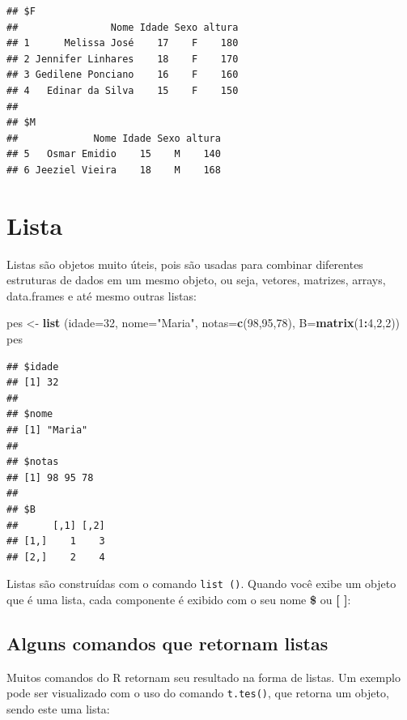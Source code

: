 \documentclass[
]{book}
\newenvironment{Shaded}{\begin{snugshade}}{\end{snugshade}}
\newcommand{\DataTypeTok}[1]{\textcolor[rgb]{0.13,0.29,0.53}{#1}}
\newcommand{\DecValTok}[1]{\textcolor[rgb]{0.00,0.00,0.81}{#1}}
\newcommand{\KeywordTok}[1]{\textcolor[rgb]{0.13,0.29,0.53}{\textbf{#1}}}
\newcommand{\NormalTok}[1]{#1}
\newcommand{\OperatorTok}[1]{\textcolor[rgb]{0.81,0.36,0.00}{\textbf{#1}}}
\newcommand{\StringTok}[1]{\textcolor[rgb]{0.31,0.60,0.02}{#1}}
\begin{document}
\begin{verbatim}
## $F
##                Nome Idade Sexo altura
## 1      Melissa José    17    F    180
## 2 Jennifer Linhares    18    F    170
## 3 Gedilene Ponciano    16    F    160
## 4   Edinar da Silva    15    F    150
## 
## $M
##             Nome Idade Sexo altura
## 5   Osmar Emidio    15    M    140
## 6 Jeeziel Vieira    18    M    168
\end{verbatim}

\hypertarget{lista}{%
\section{Lista}\label{lista}}

Listas são objetos muito úteis, pois são usadas para combinar diferentes estruturas de dados em um mesmo objeto, ou seja, vetores, matrizes, arrays, data.frames e até mesmo outras listas:

\begin{Shaded}
\begin{Highlighting}[]
\NormalTok{pes <-}\StringTok{ }\KeywordTok{list}\NormalTok{ (}\DataTypeTok{idade=}\DecValTok{32}\NormalTok{, }\DataTypeTok{nome=}\StringTok{"Maria"}\NormalTok{, }\DataTypeTok{notas=}\KeywordTok{c}\NormalTok{(}\DecValTok{98}\NormalTok{,}\DecValTok{95}\NormalTok{,}\DecValTok{78}\NormalTok{), }\DataTypeTok{B=}\KeywordTok{matrix}\NormalTok{(}\DecValTok{1}\OperatorTok{:}\DecValTok{4}\NormalTok{,}\DecValTok{2}\NormalTok{,}\DecValTok{2}\NormalTok{))}
\NormalTok{pes}
\end{Highlighting}
\end{Shaded}

\begin{verbatim}
## $idade
## [1] 32
## 
## $nome
## [1] "Maria"
## 
## $notas
## [1] 98 95 78
## 
## $B
##      [,1] [,2]
## [1,]    1    3
## [2,]    2    4
\end{verbatim}

Listas são construídas com o comando \texttt{list\ ()}. Quando você exibe um objeto que é uma lista, cada componente é exibido com o seu nome \textbf{\$} ou \textbf{{[} {]}}:

\hypertarget{alguns-comandos-que-retornam-listas}{%
\subsection{Alguns comandos que retornam listas}\label{alguns-comandos-que-retornam-listas}}

Muitos comandos do R retornam seu resultado na forma de listas. Um exemplo pode ser visualizado com o uso do comando \texttt{t.tes()}, que retorna um objeto, sendo este uma lista:
\end{document}
